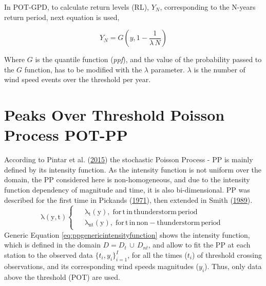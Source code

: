 \documentclass[12pt,oneside]{reedthesis}
\begin{document}
In POT-GPD, to calculate return levels (RL), \(Y_N\), corresponding to the N-years return period, next equation is used,

\[
Y_N =G\left(y, 1-\frac{1}{\lambda\,N}\right)
\]

Where \(G\) is the quantile function (\emph{ppf}), and the value of the probability passed to the \(G\) function, has to be modified with the \(\lambda\) parameter. \(\lambda\) is the number of wind speed events over the threshold per year.

\hypertarget{method-pot-pp}{%
\section{Peaks Over Threshold Poisson Process POT-PP}\label{method-pot-pp}}

According to Pintar et al. (\protect\hyperlink{ref-Pintar2015}{2015}) the stochastic Poisson Process - PP is mainly defined by its intensity function. As the intensity function is not uniform over the domain, the PP considered here is non-homogeneous, and due to the intensity function dependency of magnitude and time, it is also bi-dimensional. PP was described for the first time in Pickands (\protect\hyperlink{ref-Pickands1971}{1971}), then extended in Smith (\protect\hyperlink{ref-Smith1989}{1989}).
\begin{equation}
  \mathrm{
    \lambda\left(y,t\right)
    \begin{cases}
      \begin{split}
            &\lambda_t(y),\;for\,t\,in\,thunderstorm\,period
            \\
            &\lambda_{nt}(y),\;for\,t\,in\,non-thunderstorm\,period      
      \end{split}
    \end{cases}
  }
  \label{eq:ppgenericintensityfunction}
\end{equation}
Generic Equation \eqref{eq:ppgenericintensityfunction} shows the intensity function, which is defined in the domain \(D = D_t\,{\cup}\,D_{nt}\), and allow to fit the PP at each station to the observed data \(\{t_i, y_i\}_{i=1}^I\), for all the times (\(t_i\)) of threshold crossing observations, and its corresponding wind speeds magnitudes (\(y_i\)). Thus, only data above the threshold (POT) are used.
\end{document}
